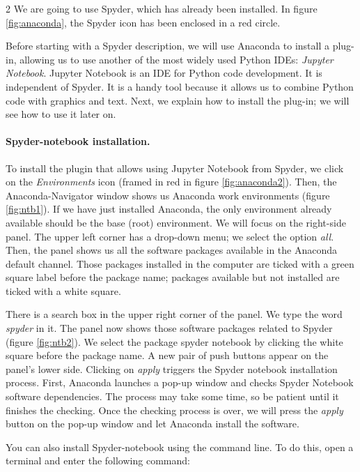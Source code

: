 \begin{paracol}{2}
 We are going to use Spyder, which has already been installed. In figure \ref{fig:anaconda}, the Spyder icon has been enclosed in a red circle.

 Before starting with a Spyder description, we will use Anaconda to install a plug-in, allowing us to use another of the most widely used Python IDEs: \emph{Jupyter Notebook}. Jupyter Notebook is an IDE for Python code development.  It is independent of Spyder. It is a handy tool because it allows us to combine Python code with graphics and text. Next, we explain how to install the plug-in; we will see how to use it later on.
 
 \paragraph{Spyder-notebook installation.} To install the plugin that allows using Jupyter Notebook from Spyder, we click on the \emph{Environments} icon (framed in red in figure \ref{fig:anaconda2}). Then, the Anaconda-Navigator window shows us Anaconda work environments (figure \ref{fig:ntb1}). If we have just installed Anaconda, the only environment already available should be the base (root) environment. We will focus on the right-side panel. The upper left corner has a drop-down menu; we select the option \emph{all}. Then, the panel shows us all the software packages available in the Anaconda default channel. Those packages installed in the computer are ticked with a green square label before the package name; packages available but not installed are ticked with a white square.

 There is a search box in the upper right corner of the panel. We type the word \emph{spyder} in it. The panel now shows those software packages related to Spyder (figure \ref{fig:ntb2}). We select the package spyder notebook by clicking the white square before the package name. A new pair of push buttons appear on the panel's lower side. Clicking on \emph{apply} triggers the Spyder notebook installation process. First, Anaconda launches a pop-up window and checks Spyder Notebook software dependencies. The process may take some time, so be patient until it finishes the checking.  Once the checking process is over, we will press the \emph{apply} button on the pop-up window and let Anaconda install the software.
 
You can also install Spyder-notebook using the command line. To do this, open a terminal and enter the following command:
\end{paracol}

